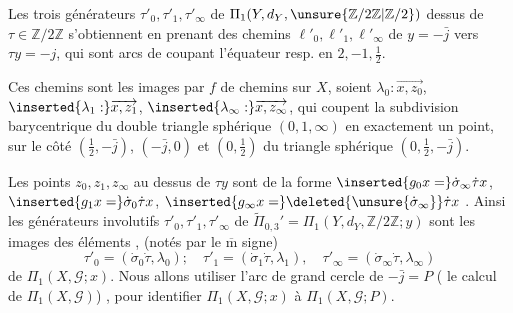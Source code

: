 Les trois générateurs 
 $\tau'_0,\tau'_1,\tau'_\infty$
de $\Pi_1(Y,d_Y,
\unsure{\mathbb Z/2\mathbb Z|\mathbb Z/2})$
 dessus de $\tau\in\mathbb Z/2\mathbb Z$
s'obtiennent en prenant des chemins $\ell'_0,\ell'_1,\ell'_\infty$
de  $y=-\bar j$ vers
 $\tau y=-j$, qui sont  arcs de
 coupant l'équateur resp. en $2,-1,\frac12$.



Ces chemins sont les images par $f$ de chemins
sur $X$, soient $\lambda_0:\overrightarrow{x,z_0}$,
$\inserted{\lambda_1:}\overrightarrow{x,z_1}$,
$\inserted{\lambda_\infty:}\overrightarrow{x,z_\infty}$,
qui coupent  la subdivision barycentrique du double
triangle sphérique $(0,1,\infty)$ en exactement un point,
  sur le côté
$(\frac12,-\bar j)$, $(-\bar j,0)$ et $(0,\frac12)$
du triangle sphérique $(0,\frac12,-\bar j)$.


Les points  $z_0,z_1,z_\infty$ au dessus de
$\tau y$ sont  de la forme
$\inserted{g_0x=}\dot\sigma_\infty\dot\tau x$,
$\inserted{g_1x=}\dot\sigma_0\dot\tau x$,
$\inserted{g_\infty x=}\deleted{\unsure{\dot\sigma_\infty}}\dot\tau x$
.
Ainsi les générateurs involutifs
$\tau'_0,\tau'_1,\tau'_\infty$ de
$\widetilde\Pi_{0,3}'=\Pi_1(Y,d_Y,\mathbb Z/2\mathbb Z;y)$
sont les images des éléments
,
(notés par le $\overline{\mathrm m}$ signe)
\[
\tau'_0=(\dot\sigma_0\dot\tau,\lambda_0);\quad
\tau'_1=(\dot\sigma_1\dot\tau,\lambda_1),\quad
\tau'_\infty=(\dot\sigma_\infty\dot\tau,\lambda_\infty)
\]
de $\Pi_1(X,\mathcal G;x)$.
Nous allons utiliser l'arc de grand cercle \inserted{$\ell$}
de  $-\bar j=P$
( 
  le calcul de $\Pi_1(X,\mathcal G)$)
, pour identifier $\Pi_1(X,\mathcal G;x)$
à $\Pi_1(X,\mathcal G;P)$.

